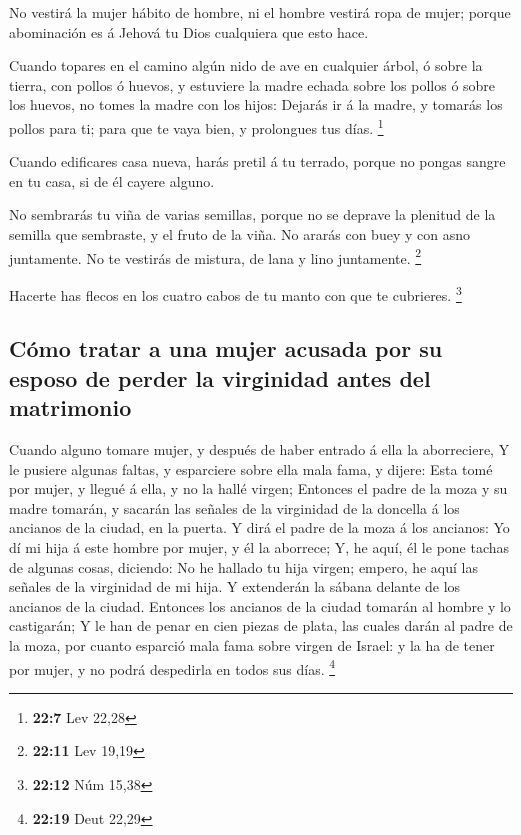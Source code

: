  No vestirá la mujer hábito de hombre, ni el hombre
vestirá ropa de mujer; porque abominación es á Jehová tu Dios cualquiera
que esto hace.

 Cuando topares en el camino algún nido de ave en
cualquier árbol, ó sobre la tierra, con pollos ó huevos, y estuviere la
madre echada sobre los pollos ó sobre los huevos, no tomes la madre con
los hijos:  Dejarás ir á la madre, y tomarás los pollos
para ti; para que te vaya bien, y prolongues tus días. \footnote{\textbf{22:7}
  Lev 22,28}

 Cuando edificares casa nueva, harás pretil á tu terrado,
porque no pongas sangre en tu casa, si de él cayere alguno.

 No sembrarás tu viña de varias semillas, porque no se
deprave la plenitud de la semilla que sembraste, y el fruto de la viña.
 No ararás con buey y con asno juntamente.
 No te vestirás de mistura, de lana y lino juntamente.
\footnote{\textbf{22:11} Lev 19,19}

 Hacerte has flecos en los cuatro cabos de tu manto con
que te cubrieres. \footnote{\textbf{22:12} Núm 15,38}

\hypertarget{cuxf3mo-tratar-a-una-mujer-acusada-por-su-esposo-de-perder-la-virginidad-antes-del-matrimonio}{%
\subsection{Cómo tratar a una mujer acusada por su esposo de perder la
virginidad antes del
matrimonio}\label{cuxf3mo-tratar-a-una-mujer-acusada-por-su-esposo-de-perder-la-virginidad-antes-del-matrimonio}}

 Cuando alguno tomare mujer, y después de haber entrado á
ella la aborreciere,  Y le pusiere algunas faltas, y
esparciere sobre ella mala fama, y dijere: Esta tomé por mujer, y llegué
á ella, y no la hallé virgen;  Entonces el padre de la
moza y su madre tomarán, y sacarán las señales de la virginidad de la
doncella á los ancianos de la ciudad, en la puerta.  Y
dirá el padre de la moza á los ancianos: Yo dí mi hija á este hombre por
mujer, y él la aborrece;  Y, he aquí, él le pone tachas
de algunas cosas, diciendo: No he hallado tu hija virgen; empero, he
aquí las señales de la virginidad de mi hija. Y extenderán la sábana
delante de los ancianos de la ciudad.  Entonces los
ancianos de la ciudad tomarán al hombre y lo castigarán; 
Y le han de penar en cien piezas de plata, las cuales darán al padre de
la moza, por cuanto esparció mala fama sobre virgen de Israel: y la ha
de tener por mujer, y no podrá despedirla en todos sus días. \footnote{\textbf{22:19}
  Deut 22,29}

